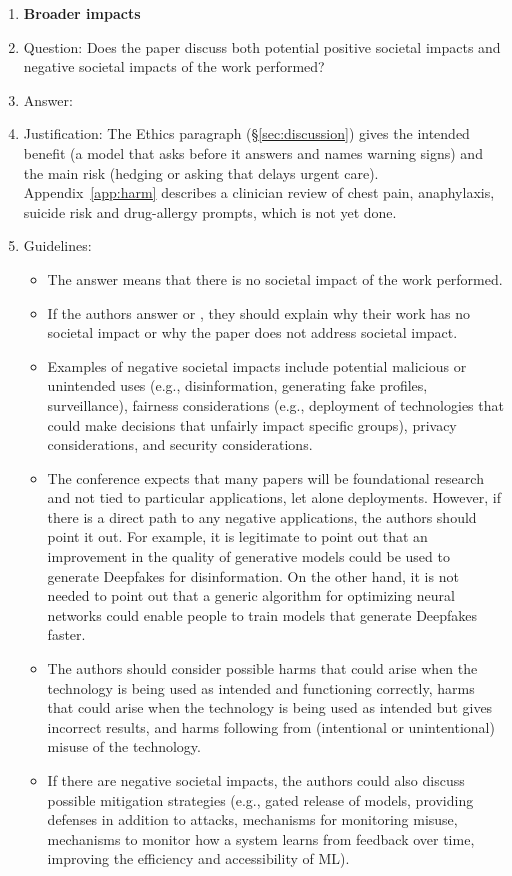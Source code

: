 \begin{enumerate}
\item {\bf Broader impacts}
    \item[] Question: Does the paper discuss both potential positive societal impacts and negative societal impacts of the work performed?
    \item[] Answer: \answerYes{}
    \item[] Justification: The Ethics paragraph (\S\ref{sec:discussion}) gives the intended benefit (a model that asks before it answers and names warning signs) and the main risk (hedging or asking that delays urgent care). Appendix~\ref{app:harm} describes a clinician review of chest pain, anaphylaxis, suicide risk and drug-allergy prompts, which is not yet done.
    \item[] Guidelines:
    \begin{itemize}
        \item The answer \answerNA{} means that there is no societal impact of the work performed.
        \item If the authors answer \answerNA{} or \answerNo, they should explain why their work has no societal impact or why the paper does not address societal impact.
        \item Examples of negative societal impacts include potential malicious or unintended uses (e.g., disinformation, generating fake profiles, surveillance), fairness considerations (e.g., deployment of technologies that could make decisions that unfairly impact specific groups), privacy considerations, and security considerations.
        \item The conference expects that many papers will be foundational research and not tied to particular applications, let alone deployments. However, if there is a direct path to any negative applications, the authors should point it out. For example, it is legitimate to point out that an improvement in the quality of generative models could be used to generate Deepfakes for disinformation. On the other hand, it is not needed to point out that a generic algorithm for optimizing neural networks could enable people to train models that generate Deepfakes faster.
        \item The authors should consider possible harms that could arise when the technology is being used as intended and functioning correctly, harms that could arise when the technology is being used as intended but gives incorrect results, and harms following from (intentional or unintentional) misuse of the technology.
        \item If there are negative societal impacts, the authors could also discuss possible mitigation strategies (e.g., gated release of models, providing defenses in addition to attacks, mechanisms for monitoring misuse, mechanisms to monitor how a system learns from feedback over time, improving the efficiency and accessibility of ML).
    \end{itemize}


\end{enumerate}
